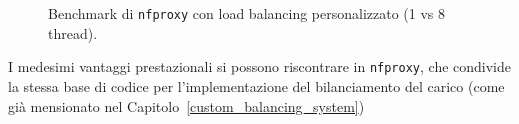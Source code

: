 \begin{figure}[H]
    \centering
    
    \caption{Benchmark di \texttt{\gls{nfproxy}} con load balancing personalizzato (1 vs 8 thread).}\label{fig:nfproxy_multithread_benchmark}
\end{figure}

I medesimi vantaggi prestazionali si possono riscontrare in \texttt{\gls{nfproxy}}, che condivide la stessa base di codice per l'implementazione del bilanciamento del carico (come già mensionato nel Capitolo~\ref{custom_balancing_system})
